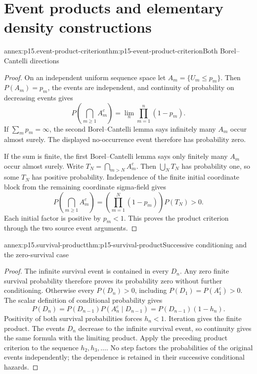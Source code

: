 \section{Event products and elementary density constructions}
\label{sec:annex-p15-density-and-product-exercises}

\begin{annexitem}{annex:p15.event-product-criterion}{thm:p15-event-product-criterion}{Both Borel--Cantelli directions}
\begin{proof}
On an independent uniform sequence space let \(A_m=\{U_m\leq p_m\}\).
Then \(P(A_m)=p_m\), the events are independent, and continuity
of probability on decreasing events gives
\[
             P\!\left(\bigcap_{m\geq1}A_m^c\right)
                 =\lim_n\prod_{m=1}^n(1-p_m).
\]
If \(\sum_mp_m=\infty\), the second Borel--Cantelli lemma says
infinitely many \(A_m\) occur almost surely. The displayed
no-occurrence event therefore has probability zero.

If the sum is finite, the first Borel--Cantelli lemma says only
finitely many \(A_m\) occur almost surely. Write
\(T_N=\bigcap_{m>N}A_m^c\).
Then \(\bigcup_NT_N\) has probability one, so some \(T_N\)
has positive probability. Independence of the finite initial
coordinate block from the remaining coordinate sigma-field gives
\[
 P\!\left(\bigcap_{m\geq1}A_m^c\right)
           =\left(\prod_{m=1}^N(1-p_m)\right)P(T_N)>0.
\]
Each initial factor is positive by \(p_m<1\). This proves the
product criterion through the two source event arguments.
\end{proof}
\end{annexitem}

\begin{annexitem}{annex:p15.survival-product}{thm:p15-survival-product}{Successive conditioning and the zero-survival case}
\begin{proof}
The infinite survival event is contained in every \(D_n\).
Any zero finite survival probability therefore proves its probability
zero without further conditioning.
Otherwise every \(P(D_n)>0\), including \(P(D_1)=P(A_1^c)>0\).
The scalar definition of conditional probability gives
\[
 P(D_n)=P(D_{n-1})P(A_n^c\mid D_{n-1})
                         =P(D_{n-1})(1-h_n).
\]
Positivity of both survival probabilities forces \(h_n<1\).
Iteration gives the finite product. The events \(D_n\) decrease to
the infinite survival event, so continuity gives the same formula
with the limiting product. Apply the preceding product criterion
to the sequence \(h_2,h_3,\ldots\).
No step factors the probabilities of the original events independently;
the dependence is retained in their successive conditional hazards.
\end{proof}
\end{annexitem}

